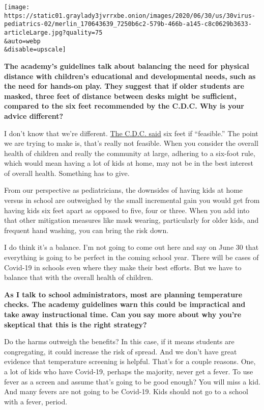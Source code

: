 \texttt{[image: https://static01.graylady3jvrrxbe.onion/images/2020/06/30/us/30virus-pediatrics-02/merlin\_170643639\_7250b6c2-579b-466b-a145-c8c0629b3633-articleLarge.jpg?quality=75\\\&auto=webp\\\&disable=upscale]}

\textbf{The academy's guidelines talk about balancing the need for
physical distance with children's educational and developmental needs,
such as the need for hands-on play. They suggest that if older students
are masked, three feet of distance between desks might be sufficient,
compared to the six feet recommended by the C.D.C. Why is your advice
different?}

I don't know that we're different.
\href{https://www.cdc.gov/coronavirus/2019-ncov/community/schools-childcare/schools.html}{The
C.D.C. said} six feet if ``feasible.'' The point we are trying to make
is, that's really not feasible. When you consider the overall health of
children and really the community at large, adhering to a six-foot rule,
which would mean having a lot of kids at home, may not be in the best
interest of overall health. Something has to give.

From our perspective as pediatricians, the downsides of having kids at
home versus in school are outweighed by the small incremental gain you
would get from having kids six feet apart as opposed to five, four or
three. When you add into that other mitigation measures like mask
wearing, particularly for older kids, and frequent hand washing, you can
bring the risk down.

I do think it's a balance. I'm not going to come out here and say on
June 30 that everything is going to be perfect in the coming school
year. There will be cases of Covid-19 in schools even where they make
their best efforts. But we have to balance that with the overall health
of children.

\textbf{As I talk to school administrators, most are planning
temperature checks. The academy guidelines warn this could be
impractical and take away instructional time. Can you say more about why
you're skeptical that this is the right strategy?}

Do the harms outweigh the benefits? In this case, if it means students
are congregating, it could increase the risk of spread. And we don't
have great evidence that temperature screening is helpful. That's for a
couple reasons. One, a lot of kids who have Covid-19, perhaps the
majority, never get a fever. To use fever as a screen and assume that's
going to be good enough? You will miss a kid. And many fevers are not
going to be Covid-19. Kids should not go to a school with a fever,
period.

